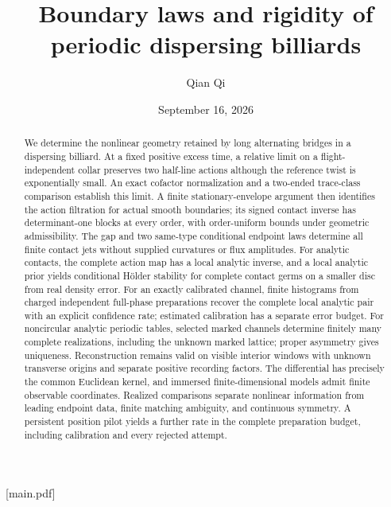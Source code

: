 
[main.pdf]
\title[Boundary laws and periodic rigidity]{Boundary laws and rigidity of periodic dispersing billiards}
\author{Qian Qi}
\date{September 16, 2026}


\begin{abstract}
We determine the nonlinear geometry retained by long alternating bridges
in a dispersing billiard.  At a fixed positive excess time, a relative
limit on a flight-independent collar preserves two half-line actions
although the reference twist is exponentially small.  An exact cofactor
normalization and a two-ended trace-class comparison establish this limit.
A finite stationary-envelope argument then identifies the action filtration
for actual smooth boundaries; its signed contact inverse has determinant-one
blocks at every order, with order-uniform bounds under geometric
admissibility.  The gap and two same-type conditional endpoint laws determine
all finite contact jets without supplied curvatures or flux amplitudes.
For analytic contacts, the complete action map has a local analytic inverse,
and a local analytic prior yields conditional H\"older stability for complete
contact germs on a smaller disc from real density error.
For an exactly calibrated channel, finite histograms from charged independent
full-phase preparations recover the complete local analytic pair with an
explicit confidence rate; estimated calibration has a separate error budget.
For noncircular analytic periodic tables, selected marked channels determine
finitely many complete realizations, including the unknown marked lattice;
proper asymmetry gives uniqueness.  Reconstruction remains valid on visible
interior windows with unknown transverse origins and separate positive
recording factors.  The differential has precisely the common Euclidean
kernel, and immersed finite-dimensional models admit finite observable
coordinates.  Realized comparisons separate nonlinear information from
leading endpoint data, finite matching ambiguity, and continuous symmetry.
A persistent position pilot yields a further rate in the complete
preparation budget, including calibration and every rejected attempt.
\end{abstract}
\maketitle
\enlargethispage{2pt}
\setcounter{tocdepth}{1}
\tableofcontents


